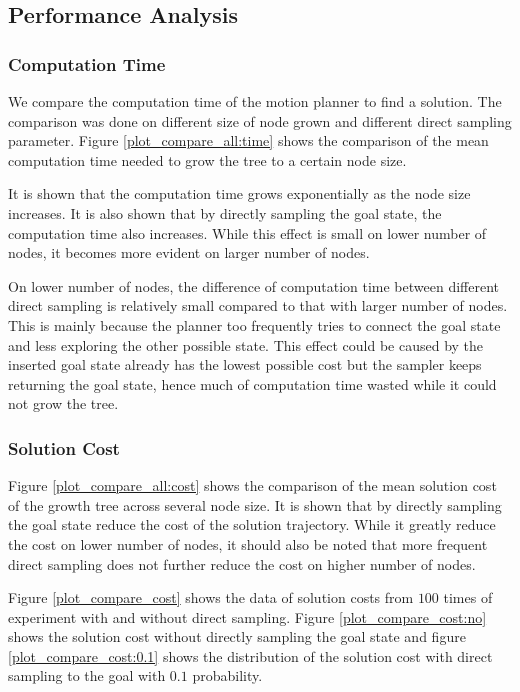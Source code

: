 \documentclass[conference]{IEEEtran}
\begin{document}
\subsection{Performance Analysis}

\subsubsection{Computation Time}
We compare the computation time of the motion planner to find a solution. The comparison was done on different size of node grown and different direct sampling parameter. Figure \ref{plot_compare_all:time} shows the comparison of the mean computation time needed to grow the tree to a certain node size. 

It is shown that the computation time grows exponentially as the node size increases. It is also shown that by directly sampling the goal state, the computation time also increases. While this effect is small on lower number of nodes, it becomes more evident on larger number of nodes. 

On lower number of nodes, the difference of computation time between different direct sampling is relatively small compared to that with larger number of nodes. This is mainly because the planner too frequently tries to connect the goal state and less exploring the other possible state. This effect could be caused by the inserted goal state already has the lowest possible cost but the sampler keeps returning the goal state, hence much of computation time wasted while it could not grow the tree.

\subsubsection{Solution Cost}
Figure \ref{plot_compare_all:cost} shows the comparison of the mean solution cost of the growth tree across several node size. It is shown that by directly sampling the goal state reduce the cost of the solution trajectory. While it greatly reduce the cost on lower number of nodes, it should also be noted that more frequent direct sampling does not further reduce the cost on higher number of nodes. 

Figure \ref{plot_compare_cost} shows the data of solution costs from $100$ times of experiment with and without direct sampling. Figure \ref{plot_compare_cost:no} shows the solution cost without directly sampling the goal state and figure \ref{plot_compare_cost:0.1} shows the distribution of the solution cost with direct sampling to the goal with $0.1$ probability. 
\end{document}
